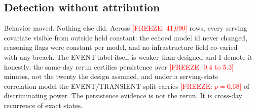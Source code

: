 \documentclass[conference]{IEEEtran}
\newcommand{\freeze}[1]{\textcolor{red}{[FREEZE: #1]}}
\begin{document}
\begin{table}[t]
\caption{Breach structure against the exact no-drift null.
\freeze{placeholder render, window 2026-08-02 to 2026-08-20, 19
probe days; regenerate at the data freeze}. Null: exact enumeration
under the smoothed baselines
(\texttt{recurrence\_structure\_null.py}); the count row is
deliberately weak and reported first. Slots within a model-day share a scaffold and
are not independent; per-slot recurrence rows are computed across
days, where the sharing argument does not apply.}
\label{tab:structure}
\centering
\scriptsize
\setlength{\tabcolsep}{3pt}
\end{table}

\subsection{Detection without attribution}
\label{sec:attribution}

Behavior moved. Nothing else did. Across \freeze{41,090} rows,
every serving covariate visible from outside held constant: the
echoed model id never changed, reasoning flags were constant per
model, and no infrastructure field co-varied with any breach. The
EVENT label itself is weaker than designed and I demote it
honestly: the same-day rerun certifies persistence over \freeze{0.4
to 5.3} minutes, not the twenty the design assumed, and under a
serving-state correlation model the EVENT/TRANSIENT split carries
\freeze{$p = 0.68$} of discriminating power. The persistence
evidence is not the rerun. It is cross-day recurrence of exact
states.
\end{document}
